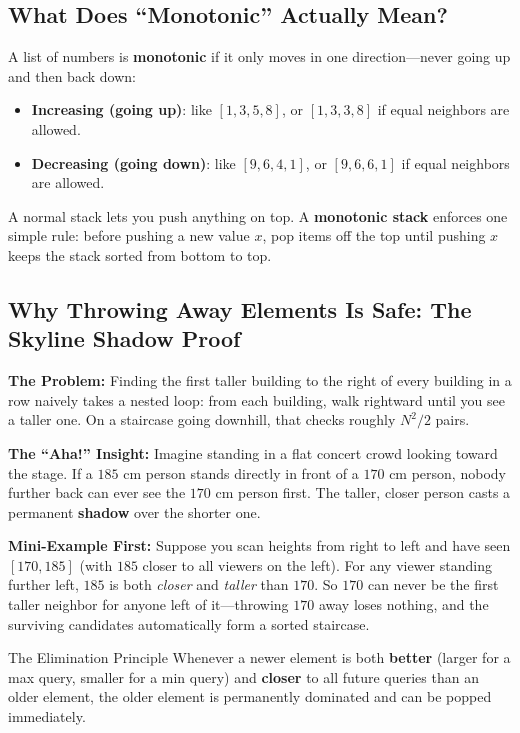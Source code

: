 \documentclass[11pt,a4paper]{article}
\theoremstyle{definition}
\newcommand{\painbeat}{\textbf{\color{accentamber}The Problem:} }
\newcommand{\ahabeat}{\textbf{\color{accentteal}The ``Aha!'' Insight:} }
\newcommand{\examplebeat}{\textbf{\color{primaryblue}Mini-Example First:} }
\begin{document}
\subsection{What Does ``Monotonic'' Actually Mean?}

A list of numbers is \textbf{monotonic} if it only moves in one direction---never going up and then back down:
\begin{itemize}
    \item \textbf{Increasing (going up)}: like $[1, 3, 5, 8]$, or $[1, 3, 3, 8]$ if equal neighbors are allowed.
    \item \textbf{Decreasing (going down)}: like $[9, 6, 4, 1]$, or $[9, 6, 6, 1]$ if equal neighbors are allowed.
\end{itemize}

A normal stack lets you push anything on top. A \textbf{monotonic stack} enforces one simple rule: before pushing a new value $x$, pop items off the top until pushing $x$ keeps the stack sorted from bottom to top.

\subsection{Why Throwing Away Elements Is Safe: The Skyline Shadow Proof}

\painbeat Finding the first taller building to the right of every building in a row naively takes a nested loop: from each building, walk rightward until you see a taller one. On a staircase going downhill, that checks roughly $N^2 / 2$ pairs.

\ahabeat Imagine standing in a flat concert crowd looking toward the stage. If a $185\text{ cm}$ person stands directly in front of a $170\text{ cm}$ person, nobody further back can ever see the $170\text{ cm}$ person first. The taller, closer person casts a permanent \textbf{shadow} over the shorter one.

\examplebeat Suppose you scan heights from right to left and have seen $[170, 185]$ (with $185$ closer to all viewers on the left). For any viewer standing further left, $185$ is both \emph{closer} and \emph{taller} than $170$. So $170$ can never be the first taller neighbor for anyone left of it---throwing $170$ away loses nothing, and the surviving candidates automatically form a sorted staircase.

\begin{calloutbox}{The Elimination Principle}
Whenever a newer element is both \textbf{better} (larger for a max query, smaller for a min query) and \textbf{closer} to all future queries than an older element, the older element is permanently dominated and can be popped immediately.
\end{calloutbox}
\end{document}
